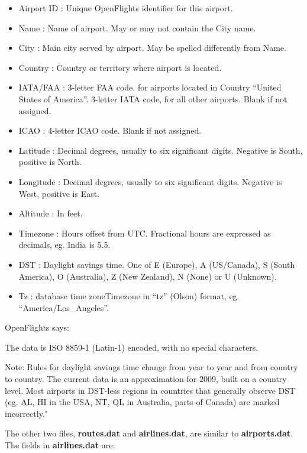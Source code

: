 \documentclass[11pt]{article}
\providecommand{\tightlist}{%
      \setlength{\itemsep}{0pt}\setlength{\parskip}{0pt}}
\begin{document}
\begin{itemize}
\tightlist
\item
  Airport ID : Unique OpenFlights identifier for this airport.
\item
  Name : Name of airport. May or may not contain the City name.
\item
  City : Main city served by airport. May be spelled differently from
  Name.
\item
  Country : Country or territory where airport is located.
\item
  IATA/FAA : 3-letter FAA code, for airports located in Country ``United
  States of America''. 3-letter IATA code, for all other airports. Blank
  if not assigned.
\item
  ICAO : 4-letter ICAO code. Blank if not assigned.
\item
  Latitude : Decimal degrees, usually to six significant digits.
  Negative is South, positive is North.
\item
  Longitude : Decimal degrees, usually to six significant digits.
  Negative is West, positive is East.
\item
  Altitude : In feet.
\item
  Timezone : Hours offset from UTC. Fractional hours are expressed as
  decimals, eg. India is 5.5.
\item
  DST : Daylight savings time. One of E (Europe), A (US/Canada), S
  (South America), O (Australia), Z (New Zealand), N (None) or U
  (Unknown).
\item
  Tz : database time zoneTimezone in ``tz'' (Olson) format, eg.
  ``America/Los\_Angeles''.
\end{itemize}

    OpenFlights says:

The data is ISO 8859-1 (Latin-1) encoded, with no special characters.

Note: Rules for daylight savings time change from year to year and from
country to country. The current data is an approximation for 2009, built
on a country level. Most airports in DST-less regions in countries that
generally observe DST (eg. AL, HI in the USA, NT, QL in Australia, parts
of Canada) are marked incorrectly."

    The other two files, \textbf{routes.dat} and \textbf{airlines.dat}, are
similar to \textbf{airports.dat}. The fields in \textbf{airlines.dat}
are:
\end{document}
